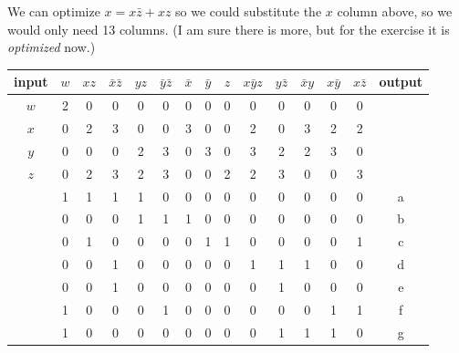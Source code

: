 \documentclass[10pt,a4paper]{scrartcl}
\begin{document}
We can optimize $x=x\bar z+xz$ so we could substitute the $x$ column above, so we would only need 13 columns. (I am sure there is more, but for the exercise it is \textit{optimized} now.)

\begin{tabular}{|c||c|c|c|c|c|c|c|c|c|c|c|c|c||c|}
  \hline
 input  & $w$ & $xz$ & $\bar x\bar z$ & $yz$ & $\bar y\bar z$ & $\bar x$ & $\bar y$ & $z$ & $x\bar yz$ & $y\bar z$ & $\bar xy$ & $x\bar y$ & $x\bar z$ & output \\ \hline\hline
  $w$   & 2   & 0    &      0         &  0   &      0         &    0     &   0      &  0  &     0      &     0     &    0      &   0       &    0      &        \\ \hline
  $x$   & 0   & 2    &      3         &  0   &      0         &    3     &   0      &  0  &     2      &     0     &    3      &   2       &    2      &        \\ \hline
  $y$   & 0   & 0    &      0         &  2   &      3         &    0     &   3      &  0  &     3      &     2     &    2      &   3       &    0      &        \\ \hline
  $z$   & 0   & 2    &      3         &  2   &      3         &    0     &   0      &  2  &     2      &     3     &    0      &   0       &    3      &        \\ \hline\hline
        & 1   & 1    &      1         &  1   &      0         &    0     &   0      &  0  &     0      &     0     &    0      &   0       &    0      &   a    \\ \hline
        & 0   & 0    &      0         &  1   &      1         &    1     &   0      &  0  &     0      &     0     &    0      &   0       &    0      &   b    \\ \hline
        & 0   & 1    &      0         &  0   &      0         &    0     &   1      &  1  &     0      &     0     &    0      &   0       &    1      &   c    \\ \hline
        & 0   & 0    &      1         &  0   &      0         &    0     &   0      &  0  &     1      &     1     &    1      &   0       &    0      &   d    \\ \hline
        & 0   & 0    &      1         &  0   &      0         &    0     &   0      &  0  &     0      &     1     &    0      &   0       &    0      &   e    \\ \hline
        & 1   & 0    &      0         &  0   &      1         &    0     &   0      &  0  &     0      &     0     &    0      &   1       &    1      &   f    \\ \hline
        & 1   & 0    &      0         &  0   &      0         &    0     &   0      &  0  &     0      &     1     &    1      &   1       &    0      &   g    \\ \hline
\end{tabular}
\end{document}

